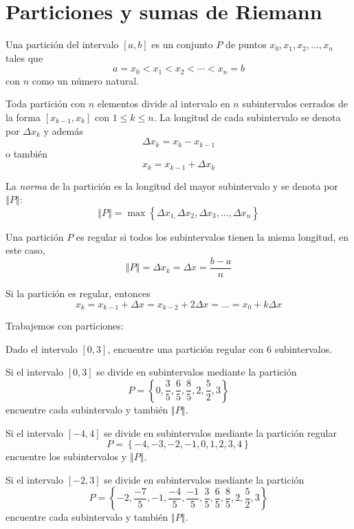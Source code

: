 \section{Particiones y sumas de Riemann}

\begin{defi}[Partición]
Una partición del intervalo $[a,b]$ es un conjunto $P$ de puntos $x_{0},x_{1},x_{2},\ldots ,x_{n}$ tales que
\[
a=x_{0}<x_{1}<x_{2}<\cdots <x_{n}=b
\]
con $n$ como un número natural.
\end{defi}

Toda partición con $n$ elementos divide al intervalo en $n$ subintervalos cerrados de la forma $[x_{k-1},x_{k}]$ con $1\leq k\leq n$. La longitud de cada subintervalo se denota por $\Delta x_{k}$ y además
\[
\Delta x_{k}=x_{k}-x_{k-1}
\]
o también
\[
x_{k}=x_{k-1}+\Delta x_{k}
\]

La \emph{norma} de la partición es la longitud del mayor subintervalo y se denota por $\left\Vert P\right\Vert$:
\[
\left\Vert P\right\Vert =\max \left\{ \Delta x_{1,}\Delta
x_{2},\Delta x_{3},\ldots ,\Delta x_{n}\right\}
\]

Una partición $P$ es regular si todos los subintervalos tienen la misma longitud, en este caso,
\[
\left\Vert P\right\Vert =\Delta x_{k}=\Delta x=\frac{b-a}{n}
\]

Si la partición es regular, entonces
\[
x_{k}=x_{k-1}+\Delta x=x_{k-2}+2\Delta x=\ldots=x_0+k\Delta x
\]

\begin{ejemplo}
Trabajemos con particiones:

\begin{parrafonumerado}
\item  Dado el intervalo $\left[ 0,3\right] $, encuentre una partición regular con $6$ subintervalos.

\item Si el intervalo $\left[ 0,3\right] $ se divide en subintervalos mediante la partición
\[
  \textit{P}=\left\{ 0,\frac{3}{5},\frac{6}{5},\frac{8}{5},2,\frac{5}{2},3\right\}
\]
encuentre cada subintervalo y también $\left\Vert P\right\Vert$.

\item Si el intervalo $\left[ -4,4\right] $ se divide en subintervalos
mediante la partición regular
\[
  \textit{P}=\left\{ -4,-3,-2,-1,0,1,2,3,4\right\}
\]
encuentre los subintervalos y $\left\Vert P\right\Vert$.

\item Si el intervalo $\left[ -2,3\right] $ se divide en subintervalos mediante la partición
\[
  P=\left\{
  -2,\frac{-7}{5},-1,\frac{-4}{5},\frac{-1}{5},\frac{3}{5},\frac{6}{5},\frac{8}{5},2,\frac{5}{2},3\right\}
\]
encuentre cada subintervalo y también $\left\Vert P\right\Vert$.

\end{parrafonumerado}
\end{ejemplo}


